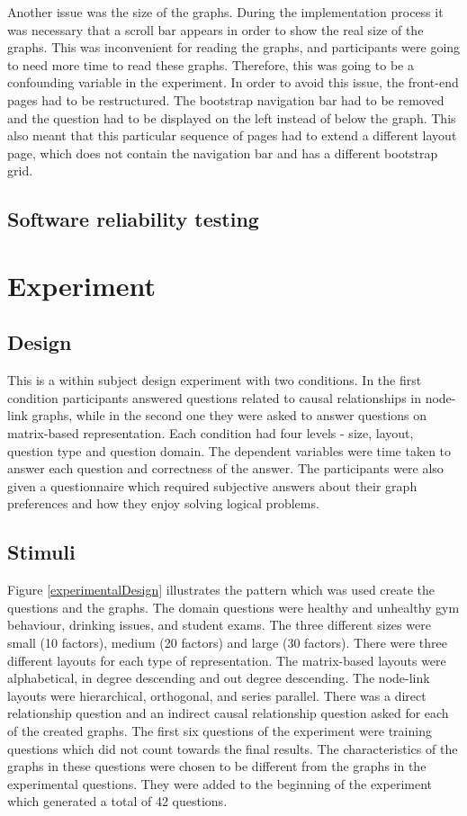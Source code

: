 \documentclass{l4proj}
\begin{document}
Another issue was the size of the graphs. During the implementation process it was necessary that a scroll bar appears in order to show the real size of the graphs. This was inconvenient for reading the graphs, and participants were going to need more time to read these graphs. Therefore, this was going to be a confounding variable in the experiment. In order to avoid this issue, the front-end pages had to be restructured. The bootstrap navigation bar had to be removed and the question had to be displayed on the left instead of below the graph. This also meant that this particular sequence of pages had to extend a different layout page, which does not contain the navigation bar and has a different bootstrap grid.

\section{Software reliability testing}

\chapter{Experiment}
\section{Design}

This is a within subject design experiment with two conditions. In the first condition participants answered questions related to causal relationships in node-link graphs, while in the second one they were asked to answer questions on matrix-based representation. Each condition had four levels - size, layout, question type and question domain. The dependent variables were time taken to answer each question and correctness of the answer. The participants were also given a questionnaire which required subjective answers about their graph preferences and how they enjoy solving logical problems. 

\section{Stimuli}

Figure \ref{experimentalDesign} illustrates the pattern which was used create the questions and the graphs. The domain questions were healthy and unhealthy gym behaviour, drinking issues, and student exams. The three different sizes were small (10 factors), medium (20 factors) and large (30 factors). There were three different layouts for each type of representation. The matrix-based layouts were alphabetical, in degree descending and out degree descending. The node-link layouts were hierarchical, orthogonal, and series parallel.  There was a direct relationship question and an indirect causal relationship question asked for each of the created graphs. The first six questions of the experiment were training questions which did not count towards the final results. The characteristics of the graphs in these questions were chosen to be different from the graphs in the experimental questions. They were added to the beginning of the experiment which generated a total of 42 questions.
\end{document}
